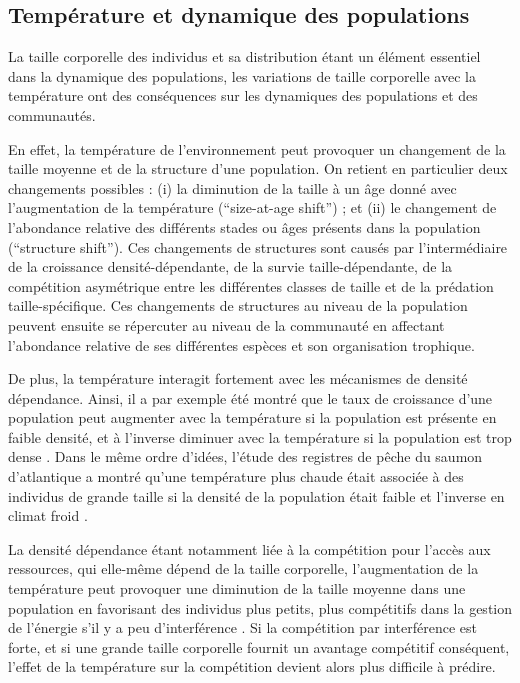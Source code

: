 \subsection{Température et dynamique des populations}

La taille corporelle des individus et sa distribution étant un élément essentiel
dans la dynamique des populations, les variations de taille corporelle avec la
température ont des conséquences sur les dynamiques des populations et des
communautés. 

En effet, la température de l'environnement peut provoquer un changement de la
taille moyenne et de la structure d'une population. On retient en particulier
deux changements possibles : (i) la diminution de la taille à un âge donné avec
l'augmentation de la température (``size-at-age shift'') ; et (ii) le
changement de l'abondance relative des différents stades ou âges présents dans
la population (``structure shift''). Ces changements de structures sont causés
par l'intermédiaire de la croissance densité-dépendante, de la survie
taille-dépendante, de la compétition asymétrique entre les différentes
classes de taille et de la prédation taille-spécifique. Ces changements de
structures au niveau de la population peuvent ensuite se répercuter au niveau de
la communauté en affectant l'abondance relative de ses différentes espèces et son
organisation trophique. 

De plus, la température interagit fortement avec les mécanismes de densité
dépendance. Ainsi, il a par exemple été montré que le taux de croissance d'une
population peut augmenter avec la température si la population est présente en
faible densité, et à l'inverse diminuer avec la température si la population est
trop dense \autocites[chez le saumon royal][]{crozier2010a}. Dans le même
ordre d'idées, l'étude des registres de pêche du saumon d'atlantique a montré
qu'une température plus chaude était associée à des individus de grande taille si la
densité de la population était faible et l'inverse en climat froid
\autocites{huusko2012a}. 

La densité dépendance étant notamment liée à la compétition pour l'accès aux
ressources, qui elle-même dépend de la taille corporelle, l'augmentation de la
température peut provoquer une diminution de la taille moyenne dans une
population en favorisant des individus plus petits, plus compétitifs dans la
gestion de l'énergie s'il y a peu d'interférence
\autocites{persson1998a,ohlberger2012a}. Si la compétition par interférence est
forte, et si une grande taille corporelle fournit un avantage compétitif
conséquent, l'effet de la température sur la compétition devient alors plus difficile à
prédire.

